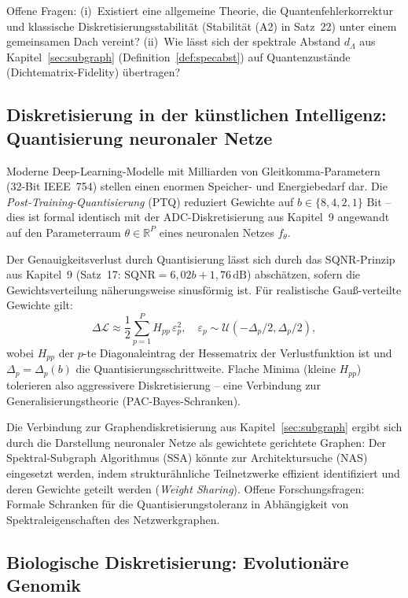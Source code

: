 ﻿\documentclass[a4paper,12pt]{article}
\theoremstyle{definition}
\begin{document}
Offene Fragen: (i)~Existiert eine allgemeine Theorie, die Quantenfehlerkorrektur und
klassische Diskretisierungsstabilität (Stabilität (A2) in Satz~22) unter einem gemeinsamen
Dach vereint? (ii)~Wie lässt sich der spektrale Abstand $d_\Lambda$ aus
Kapitel~\ref{sec:subgraph} (Definition~\ref{def:specabst}) auf Quantenzustände
(Dichtematrix-Fidelity) übertragen?

\subsection{Diskretisierung in der künstlichen Intelligenz: Quantisierung neuronaler Netze}

Moderne Deep-Learning-Modelle mit Milliarden von Gleitkomma-Parametern (32-Bit IEEE~754)
stellen einen enormen Speicher- und Energiebedarf dar. Die
\emph{Post-Training-Quantisierung} (PTQ) reduziert Gewichte auf $b \in \{8, 4, 2, 1\}$
Bit -- dies ist formal identisch mit der ADC-Diskretisierung aus Kapitel~9 angewandt auf
den Parameterraum $\theta \in \mathbb{R}^P$ eines neuronalen Netzes $f_\theta$.

Der Genauigkeitsverlust durch Quantisierung lässt sich durch das SQNR-Prinzip aus
Kapitel~9 (Satz~17: $\mathrm{SQNR} = 6{,}02b + 1{,}76\,\text{dB}$) abschätzen, sofern
die Gewichtsverteilung näherungsweise sinusförmig ist. Für realistische
Gauß-verteilte Gewichte gilt:
\[
\Delta\mathcal{L} \approx \frac{1}{2}\sum_{p=1}^P H_{pp}\,\varepsilon_p^2,
\quad \varepsilon_p \sim \mathcal{U}(-\Delta_p/2, \Delta_p/2),
\]
wobei $H_{pp}$ der $p$-te Diagonaleintrag der Hessematrix der Verlustfunktion ist und
$\Delta_p = \Delta_p(b)$ die Quantisierungsschrittweite. Flache Minima (kleine $H_{pp}$)
tolerieren also aggressivere Diskretisierung -- eine Verbindung zur Generalisierungstheorie
(PAC-Bayes-Schranken).

Die Verbindung zur Graphendiskretisierung aus Kapitel~\ref{sec:subgraph} ergibt sich durch
die Darstellung neuronaler Netze als gewichtete gerichtete Graphen: Der
Spektral-Subgraph Algorithmus (SSA) könnte zur Architektursuche (NAS) eingesetzt werden,
indem strukturähnliche Teilnetzwerke effizient identifiziert und deren Gewichte geteilt
werden (\emph{Weight Sharing}). Offene Forschungsfragen: Formale Schranken für die
Quantisierungstoleranz in Abhängigkeit von Spektraleigenschaften des Netzwerkgraphen.

\subsection{Biologische Diskretisierung: Evolutionäre Genomik}
\label{subsec:genomik}
\end{document}
